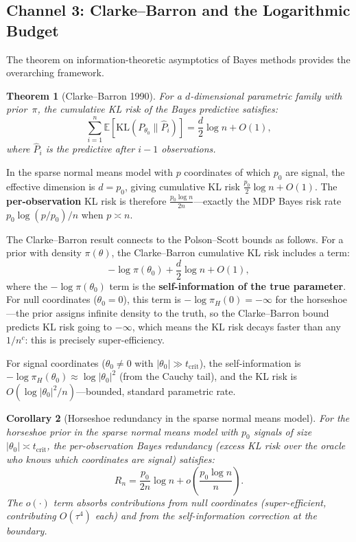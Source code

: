 \documentclass[12pt]{article}
\newtheorem{theorem}{Theorem}[section]
\newtheorem{corollary}[theorem]{Corollary}
\newcommand{\E}{\mathbb{E}}
\newcommand{\KL}{\mathrm{KL}}
\newcommand{\abs}[1]{\lvert #1 \rvert}
\newcommand{\piH}{\pi_H}
\newcommand{\tcrit}{t_{\mathrm{crit}}}
\begin{document}
\subsection{Channel 3: Clarke--Barron and the Logarithmic Budget}\label{sec:channel3}

The \citet{clarke1990information} theorem on information-theoretic asymptotics of Bayes methods provides the overarching framework.

\begin{theorem}[Clarke--Barron 1990]\label{thm:cb}
For a $d$-dimensional parametric family with prior~$\pi$, the cumulative KL risk of the Bayes predictive satisfies:
\begin{equation}\label{eq:clarke-barron}
  \sum_{i=1}^n \E\!\left[\KL(P_{\theta_0} \| \hat{P}_i)\right]
  = \frac{d}{2}\log n + O(1),
\end{equation}
where $\hat{P}_i$ is the predictive after $i-1$ observations.
\end{theorem}

In the sparse normal means model with $p$ coordinates of which $p_0$ are signal, the effective dimension is $d = p_0$, giving cumulative KL risk $\frac{p_0}{2}\log n + O(1)$. The \textbf{per-observation} KL risk is therefore $\frac{p_0 \log n}{2n}$---exactly the MDP Bayes risk rate $p_0 \log(p/p_0)/n$ when $p \asymp n$.

The Clarke--Barron result connects to the Polson--Scott bounds as follows. For a prior with density $\pi(\theta)$, the Clarke--Barron cumulative KL risk includes a term:
\begin{equation}\label{eq:self-info}
  -\log\pi(\theta_0) + \frac{d}{2}\log n + O(1),
\end{equation}
where the $-\log\pi(\theta_0)$ term is the \textbf{self-information of the true parameter}. For null coordinates ($\theta_0 = 0$), this term is $-\log\piH(0) = -\infty$ for the horseshoe---the prior assigns infinite density to the truth, so the Clarke--Barron bound predicts KL risk going to $-\infty$, which means the KL risk decays faster than any $1/n^c$: this is precisely super-efficiency.

For signal coordinates ($\theta_0 \neq 0$ with $\abs{\theta_0} \gg \tcrit$), the self-information is $-\log\piH(\theta_0) \approx \log\abs{\theta_0}^2$ (from the Cauchy tail), and the KL risk is $O(\log\abs{\theta_0}^2/n)$---bounded, standard parametric rate.

\begin{corollary}[Horseshoe redundancy in the sparse normal means model]\label{cor:redundancy}
For the horseshoe prior in the sparse normal means model with $p_0$ signals of size $\abs{\theta_0} \asymp \tcrit$, the per-observation Bayes redundancy (excess KL risk over the oracle who knows which coordinates are signal) satisfies:
\begin{equation}\label{eq:redundancy}
  R_n = \frac{p_0}{2n}\log n + o\!\left(\frac{p_0 \log n}{n}\right).
\end{equation}
The $o(\cdot)$ term absorbs contributions from null coordinates (super-efficient, contributing $O(\tau^4)$ each) and from the self-information correction at the boundary.
\end{corollary}
\end{document}
